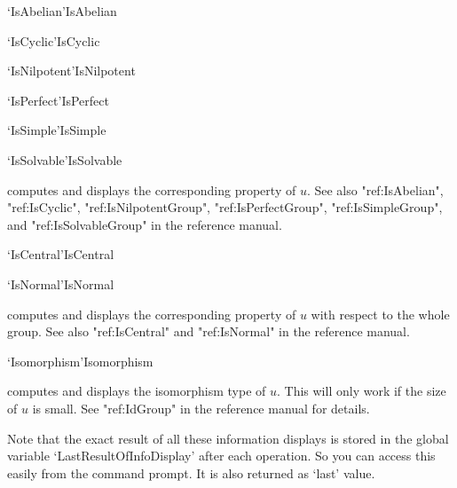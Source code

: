 \>`IsAbelian'{IsAbelian}

\>`IsCyclic'{IsCyclic}

\>`IsNilpotent'{IsNilpotent}

\>`IsPerfect'{IsPerfect}

\>`IsSimple'{IsSimple}

\>`IsSolvable'{IsSolvable}

computes and displays the corresponding property of $u$.  See also
"ref:IsAbelian", "ref:IsCyclic", "ref:IsNilpotentGroup", "ref:IsPerfectGroup",
"ref:IsSimpleGroup", and "ref:IsSolvableGroup"  in the {\GAP}
reference manual.

\>`IsCentral'{IsCentral}

\>`IsNormal'{IsNormal}

computes and displays the corresponding  property of $u$ with respect  to
the whole group.  See also "ref:IsCentral" and "ref:IsNormal" in the {\GAP}
reference manual.

\>`Isomorphism'{Isomorphism}

computes and displays  the isomorphism type of  $u$.  This will only work
if the size of $u$ is small.  See "ref:IdGroup"  in the {\GAP}
reference manual for details.

\bigskip

Note that the exact result of all these information displays is stored in
the global variable `LastResultOfInfoDisplay' after each operation. So you
can access this easily from the {\GAP} command prompt. It is also returned
as `last' value.


%
%
%
%
%
%
%
%
%
%



